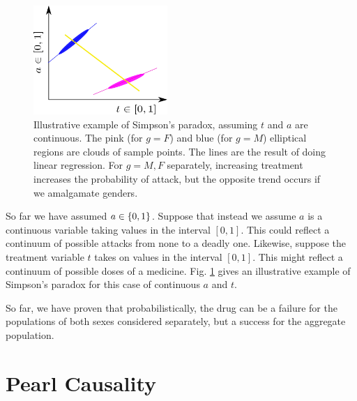 \begin{figure}[h!]
\centering
\includegraphics[width=2in]
{simpson/simpson-continuous.png}
\caption{
Illustrative example of 
Simpson's paradox, 
assuming $t$ and $a$ are 
continuous.
The pink (for $g=F$) and blue 
(for $g=M$) elliptical
regions are clouds of sample points.
The lines are the result of doing
linear regression.
For $g=M, F$ separately, increasing treatment 
increases the probability of attack,
but the opposite trend
occurs if we amalgamate genders.
}
\label{fig-simpson-continuous}
\end{figure}

So far
we have assumed 
$a\in\{0,1\}$.
Suppose that instead
we assume $a$ is a continuous variable
taking values in the interval $[0,1]$.
This could reflect a continuum of possible 
attacks from none to a deadly one.
Likewise, suppose the treatment variable
$t$ takes on values
in the interval $[0,1]$. This might
reflect a continuum of possible
doses of a medicine.
Fig. \ref{fig-simpson-continuous}
  gives an illustrative
  example 
  of Simpson's paradox
  for this case 
  of continuous $a$ and $t$.


So far, we have proven that probabilistically, 
the drug can be a failure for the populations
 of both sexes considered separately, 
but a success for the aggregate population.

\section{Pearl Causality}


